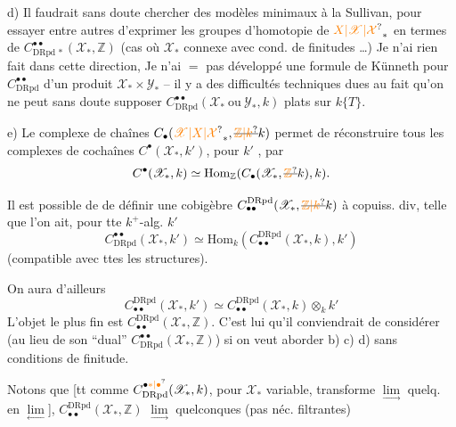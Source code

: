 d) Il faudrait sans doute chercher des modèles minimaux à la Sullivan, pour essayer entre autres d'exprimer les  groupes d'homotopie de $\unsure{X|\mathscr X|\mathcal X}_\ast$ en termes de $C^{\bullet\bullet}_{\mathrm{DRpd}\,\ast}(\mathscr X_\ast,\mathbb Z)$ (cas où $\mathscr X_\ast$  connexe avec cond. de finitudes \ldots) Je n'ai rien fait dans cette direction, Je n'ai $=$ pas développé une formule de Künneth pour $C^{\bullet\bullet}_{\mathrm{DRpd}}$ d'un produit $\mathscr X_\ast\times\mathscr Y_\ast$ -- il y a des difficultés techniques dues au fait qu'on ne peut sans doute supposer $C^{\bullet\bullet}_{\mathrm{DRpd}}(\mathscr X_\ast\ \text{ou}\ \mathscr Y_\ast,k)$ plats sur $k\{T\}$.

e) Le complexe de chaînes $C_\bullet(\unsure{\mathscr X|X|\mathcal X}_\ast,\deleted{\unsure{\mathbb Z|k}}k)$ permet de réconstruire tous les complexes de cochaînes $C^\bullet(\mathscr X_\ast,k')$, pour $k'$  , par
\[
C^\bullet(\mathscr X_\ast,k)\simeq\mathrm{Hom}_{\mathbb Z}(C_\bullet(\mathscr X_\ast,\deleted{\unsure{\mathbb Z}}k),k).
\]

Il est possible de  de définir une cobigèbre  $C_{\bullet\bullet}^{\mathrm{DRpd}}(\mathscr X_\ast,\deleted{\unsure{\mathbb Z|k}}k)$  à copuiss. div, telle que l'on ait, pour tte $k^{+}$-alg. $k'$
\[
C^{\bullet\bullet}_{\mathrm{DRpd}}(\mathscr X_\ast,k')\simeq\mathrm{Hom}_k(C_{\bullet\bullet}^{\mathrm{DRpd}}(\mathscr X_\ast,k),k')
\]
(compatible avec ttes les structures).

On aura d'ailleurs
\[
C_{\bullet\bullet}^{\mathrm{DRpd}}(\mathscr X_\ast,k')\simeq C_{\bullet\bullet}^{\mathrm{DRpd}}(\mathscr X_\ast,k)\otimes_k k'
\]
L'objet le plus fin est $C_{\bullet\bullet}^{\mathrm{DRpd}}(\mathscr X_\ast,\mathbb Z)$. C'est lui qu'il conviendrait de considérer (au lieu de son ``dual'' $C^{\bullet\bullet}_{\mathrm{DRpd}}(\mathscr X_\ast,\mathbb Z)$) si on veut aborder b) c) d) sans conditions de finitude.

Notons que [tt comme $C^{\bullet\unsure{\ast|\bullet}}_{\mathrm{DRpd}}(\mathscr X_\ast,k)$, pour $\mathscr X_\ast$ variable, transforme $\underset{\longrightarrow}{\lim}$ quelq. en $\underset{\longleftarrow}{\lim}$], $C_{\bullet\bullet}^{\mathrm{DRpd}}(\mathscr X_\ast,\mathbb Z)$   $\underset{\longrightarrow}{\lim}$ quelconques (pas néc. filtrantes)

